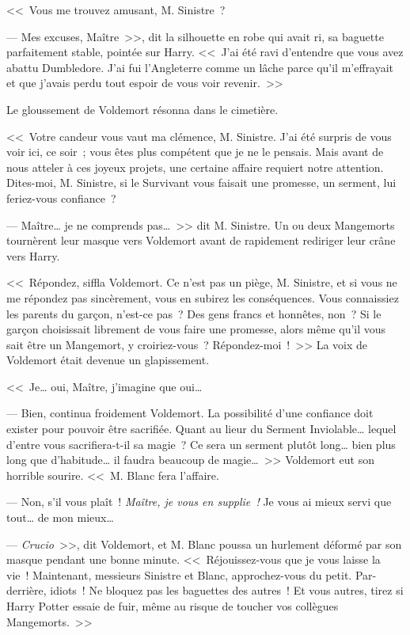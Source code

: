 <<~Vous me trouvez amusant, M. Sinistre~?

--- Mes excuses, Maître~>>, dit la silhouette en robe qui avait ri, sa baguette parfaitement stable, pointée sur Harry. <<~J'ai été ravi d'entendre que vous avez abattu Dumbledore. J'ai fui l'Angleterre comme un lâche parce qu'il m'effrayait et que j'avais perdu tout espoir de vous voir revenir.~>>

Le gloussement de Voldemort résonna dans le cimetière.

<<~Votre candeur vous vaut ma clémence, M. Sinistre. J'ai été surpris de vous voir ici, ce soir~; vous êtes plus compétent que je ne le pensais. Mais avant de nous atteler à ces joyeux projets, une certaine affaire requiert notre attention. Dites-moi, M. Sinistre, si le Survivant vous faisait une promesse, un serment, lui feriez-vous confiance~?

--- Maître… je ne comprends pas…~>> dit M. Sinistre. Un ou deux Mangemorts tournèrent leur masque vers Voldemort avant de rapidement rediriger leur crâne vers Harry.

<<~Répondez, siffla Voldemort. Ce n'est pas un piège, M. Sinistre, et si vous ne me répondez pas sincèrement, vous en subirez les conséquences. Vous connaissiez les parents du garçon, n'est-ce pas~? Des gens francs et honnêtes, non~? Si le garçon choisissait librement de vous faire une promesse, alors même qu'il vous sait être un Mangemort, y croiriez-vous~? Répondez-moi~!~>> La voix de Voldemort était devenue un glapissement.

<<~Je… oui, Maître, j'imagine que oui…

--- Bien, continua froidement Voldemort. La possibilité d'une confiance doit exister pour pouvoir être sacrifiée. Quant au lieur du Serment Inviolable… lequel d'entre vous sacrifiera-t-il sa magie~? Ce sera un serment plutôt long… bien plus long que d'habitude… il faudra beaucoup de magie…~>> Voldemort eut son horrible sourire. <<~M. Blanc fera l'affaire.

--- Non, s'il vous plaît~! \emph{Maître, je vous en supplie~!} Je vous ai mieux servi que tout… de mon mieux…

--- \emph{Crucio}~>>, dit Voldemort, et M. Blanc poussa un hurlement déformé par son masque pendant une bonne minute. <<~Réjouissez-vous que je vous laisse la vie~! Maintenant, messieurs Sinistre et Blanc, approchez-vous du petit. Par-derrière, idiots~! Ne bloquez pas les baguettes des autres~! Et vous autres, tirez si Harry Potter essaie de fuir, même au risque de toucher vos collègues Mangemorts.~>>

